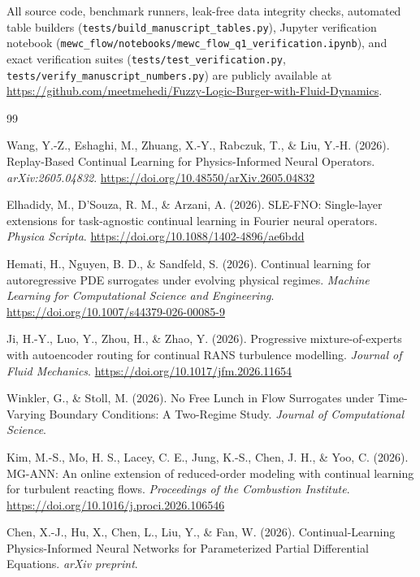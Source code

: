 \documentclass[11pt,a4paper]{article}
\begin{document}
All source code, benchmark runners, leak-free data integrity checks, automated table builders (\texttt{tests/build\_manuscript\_tables.py}), Jupyter verification notebook (\texttt{mewc\_flow/notebooks/mewc\_flow\_q1\_verification.ipynb}), and exact verification suites (\texttt{tests/test\_verification.py}, \texttt{tests/verify\_manuscript\_numbers.py}) are publicly available at \url{https://github.com/meetmehedi/Fuzzy-Logic-Burger-with-Fluid-Dynamics}.

\FloatBarrier
\begin{thebibliography}{99}

Wang, Y.-Z., Eshaghi, M., Zhuang, X.-Y., Rabczuk, T., \& Liu, Y.-H. (2026). Replay-Based Continual Learning for Physics-Informed Neural Operators. \textit{arXiv:2605.04832}. \url{https://doi.org/10.48550/arXiv.2605.04832}

Elhadidy, M., D'Souza, R. M., \& Arzani, A. (2026). SLE-FNO: Single-layer extensions for task-agnostic continual learning in Fourier neural operators. \textit{Physica Scripta}. \url{https://doi.org/10.1088/1402-4896/ae6bdd}

Hemati, H., Nguyen, B. D., \& Sandfeld, S. (2026). Continual learning for autoregressive PDE surrogates under evolving physical regimes. \textit{Machine Learning for Computational Science and Engineering}. \url{https://doi.org/10.1007/s44379-026-00085-9}

Ji, H.-Y., Luo, Y., Zhou, H., \& Zhao, Y. (2026). Progressive mixture-of-experts with autoencoder routing for continual RANS turbulence modelling. \textit{Journal of Fluid Mechanics}. \url{https://doi.org/10.1017/jfm.2026.11654}

Winkler, G., \& Stoll, M. (2026). No Free Lunch in Flow Surrogates under Time-Varying Boundary Conditions: A Two-Regime Study. \textit{Journal of Computational Science}.

Kim, M.-S., Mo, H. S., Lacey, C. E., Jung, K.-S., Chen, J. H., \& Yoo, C. (2026). MG-ANN: An online extension of reduced-order modeling with continual learning for turbulent reacting flows. \textit{Proceedings of the Combustion Institute}. \url{https://doi.org/10.1016/j.proci.2026.106546}

Chen, X.-J., Hu, X., Chen, L., Liu, Y., \& Fan, W. (2026). Continual-Learning Physics-Informed Neural Networks for Parameterized Partial Differential Equations. \textit{arXiv preprint}.


\end{thebibliography}
\end{document}
